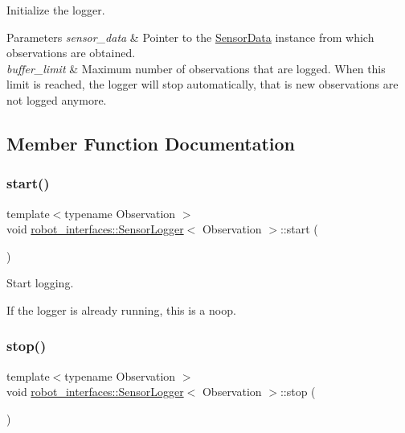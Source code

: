 Initialize the logger. 


\begin{DoxyParams}{Parameters}
{\em sensor\+\_\+data} & Pointer to the \hyperlink{classrobot__interfaces_1_1SensorData}{Sensor\+Data} instance from which observations are obtained. \\
\hline
{\em buffer\+\_\+limit} & Maximum number of observations that are logged. When this limit is reached, the logger will stop automatically, that is new observations are not logged anymore. \\
\hline
\end{DoxyParams}


\subsection{Member Function Documentation}
\mbox{\label{classrobot__interfaces_1_1SensorLogger_a264f301075b8b4330b35776b3192bee9}} 
\subsubsection{\texorpdfstring{start()}{start()}}
{\footnotesize\ttfamily template$<$typename Observation $>$ \\
void \hyperlink{classrobot__interfaces_1_1SensorLogger}{robot\+\_\+interfaces\+::\+Sensor\+Logger}$<$ Observation $>$\+::start (\begin{DoxyParamCaption}{ }\end{DoxyParamCaption})\hspace{0.3cm}{\ttfamily [inline]}}



Start logging. 

If the logger is already running, this is a noop. \mbox{\label{classrobot__interfaces_1_1SensorLogger_ac4432aabd2e52401ec02bdcdfbc54e1f}} 
\subsubsection{\texorpdfstring{stop()}{stop()}}
{\footnotesize\ttfamily template$<$typename Observation $>$ \\
void \hyperlink{classrobot__interfaces_1_1SensorLogger}{robot\+\_\+interfaces\+::\+Sensor\+Logger}$<$ Observation $>$\+::stop (\begin{DoxyParamCaption}{ }\end{DoxyParamCaption})\hspace{0.3cm}{\ttfamily [inline]}}



